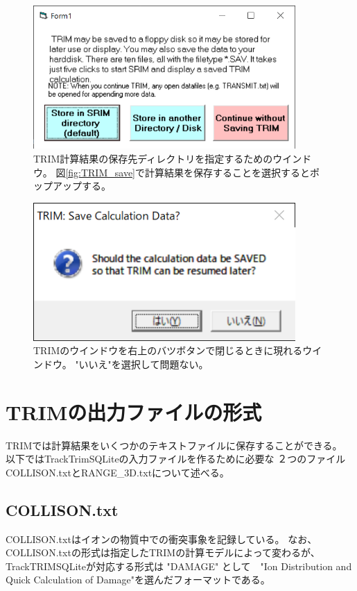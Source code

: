 \documentclass [11pt,a4paper,dvipdfmx] {jarticle}
\begin{document}
\begin{figure}[H]
    \centering
    \includegraphics[width=10cm]{./pic/TRIM_save_directory.jpg}
    \caption{TRIM計算結果の保存先ディレクトリを指定するためのウインドウ。
    図\ref{fig:TRIM_save}で計算結果を保存することを選択するとポップアップする。}
    \label{fig:TRIM_save_directory}
\end{figure}


\begin{figure}[H]
    \centering
    \includegraphics[width=10cm]{./pic/TRIM_save_status.jpg}
    \caption{TRIMのウインドウを右上のバツボタンで閉じるときに現れるウインドウ。
    "いいえ"を選択して問題ない。}
    \label{fig:TRIM_save_status}
\end{figure}




\section{TRIMの出力ファイルの形式}
TRIMでは計算結果をいくつかのテキストファイルに保存することができる。
以下ではTrackTrimSQLiteの入力ファイルを作るために必要な
２つのファイルCOLLISON.txtとRANGE\_3D.txtについて述べる。
\subsection{COLLISON.txt}
COLLISON.txtはイオンの物質中での衝突事象を記録している。
なお、COLLISON.txtの形式は指定したTRIMの計算モデルによって変わるが、
TrackTRIMSQLiteが対応する形式は "DAMAGE" として　"Ion Distribution and Quick Calculation of Damage"を選んだフォーマットである。
\end{document}
